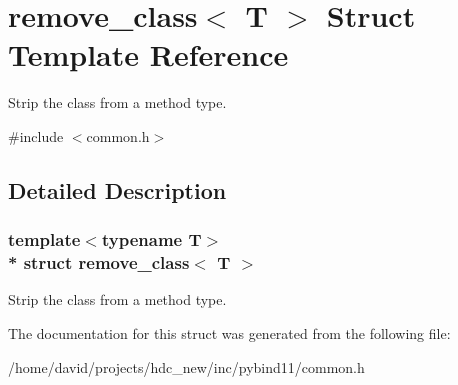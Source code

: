 \hypertarget{structremove__class}{}\section{remove\+\_\+class$<$ T $>$ Struct Template Reference}
\label{structremove__class}


Strip the class from a method type.  




{\ttfamily \#include $<$common.\+h$>$}



\subsection{Detailed Description}
\subsubsection*{template$<$typename T$>$\\*
struct remove\+\_\+class$<$ T $>$}

Strip the class from a method type. 

The documentation for this struct was generated from the following file\+:\begin{DoxyCompactItemize}
\item 
/home/david/projects/hdc\+\_\+new/inc/pybind11/common.\+h\end{DoxyCompactItemize}
